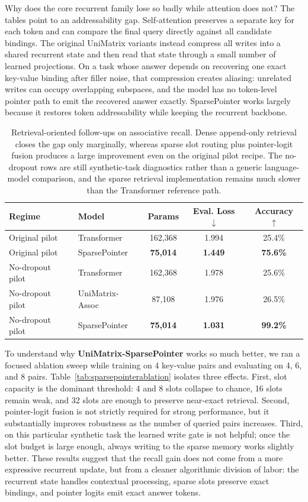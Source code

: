 \documentclass[11pt]{article}
\begin{document}
Why does the core recurrent family lose so badly while attention does not? The
tables point to an addressability gap. Self-attention preserves a separate key
for each token and can compare the final query directly against all candidate
bindings. The original UniMatrix variants instead compress all writes into a
shared recurrent state and then read that state through a small number of
learned projections. On a task whose answer depends on recovering one exact
key-value binding after filler noise, that compression creates aliasing:
unrelated writes can occupy overlapping subspaces, and the model has no
token-level pointer path to emit the recovered answer exactly. SparsePointer
works largely because it restores token addressability while keeping the
recurrent backbone.

\begin{table}[t]
\centering
\small
\begin{tabular}{llccc}
\toprule
Regime & Model & Params & Eval. Loss $\downarrow$ & Accuracy $\uparrow$ \\
\midrule
Original pilot & Transformer & 162{,}368 & 1.994 & 25.4\% \\
Original pilot & SparsePointer & \textbf{75{,}014} & \textbf{1.449} & \textbf{75.6\%} \\
No-dropout pilot & Transformer & 162{,}368 & 1.978 & 25.6\% \\
No-dropout pilot & UniMatrix-Assoc & 87{,}108 & 1.976 & 26.5\% \\
No-dropout pilot & SparsePointer & \textbf{75{,}014} & \textbf{1.031} & \textbf{99.2\%} \\
\bottomrule
\end{tabular}
\caption{Retrieval-oriented follow-ups on associative recall. Dense append-only
retrieval closes the gap only marginally, whereas sparse slot routing plus
pointer-logit fusion produces a large improvement even on the original pilot
recipe. The no-dropout rows are still synthetic-task diagnostics rather than a
generic language-model comparison, and the sparse retrieval implementation
remains much slower than the Transformer reference path.}
\label{tab:memoryfollowup}
\end{table}

To understand why \textbf{UniMatrix-SparsePointer} works so much better, we ran
a focused ablation sweep while training on 4 key-value pairs and evaluating on
4, 6, and 8 pairs. Table~\ref{tab:sparsepointerablation} isolates three
effects. First, slot capacity is the dominant threshold: 4 and 8 slots collapse
to chance, 16 slots remain weak, and 32 slots are enough to preserve near-exact
retrieval. Second, pointer-logit fusion is not strictly required for strong
performance, but it substantially improves robustness as the number of queried
pairs increases. Third, on this particular synthetic task the learned write
gate is not helpful; once the slot budget is large enough, always writing to
the sparse memory works slightly better. These results suggest that the recall
gain does not come from a more expressive recurrent update, but from a cleaner
algorithmic division of labor: the recurrent state handles contextual
processing, sparse slots preserve exact bindings, and pointer logits emit exact
answer tokens.
\end{document}
